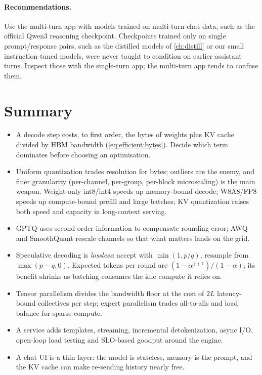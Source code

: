 \paragraph{Recommendations.} Use the multi-turn app with models trained on multi-turn chat
data, such as the official Qwen3 reasoning checkpoint. Checkpoints trained only on
single prompt/response pairs, such as the distilled models of \cref{ch:distill} or our
small instruction-tuned models, were never taught to condition on earlier assistant
turns. Inspect those with the single-turn app; the multi-turn app tends to confuse them.

\section{Summary}
\begin{itemize}
  \item A decode step costs, to first order, the bytes of weights plus KV cache divided
        by HBM bandwidth (\cref{eq:efficient:bytes}). Decide which term dominates before
        choosing an optimisation.
  \item Uniform quantization trades resolution for bytes; outliers are the enemy, and
        finer granularity (per-channel, per-group, per-block microscaling) is the main
        weapon. Weight-only int8/int4 speeds up memory-bound decode; W8A8/FP8 speeds up
        compute-bound prefill and large batches; KV quantization raises both speed and
        capacity in long-context serving.
  \item GPTQ uses second-order information to compensate rounding error; AWQ and SmoothQuant
        rescale channels so that what matters lands on the grid.
  \item Speculative decoding is \emph{lossless}: accept with $\min(1,p/q)$, resample from
        $\max(p-q,0)$. Expected tokens per round are $(1-\alpha^{\gamma+1})/(1-\alpha)$;
        its benefit shrinks as batching consumes the idle compute it relies on.
  \item Tensor parallelism divides the bandwidth floor at the cost of $2L$ latency-bound
        collectives per step; expert parallelism trades all-to-alls and load balance for
        sparse compute.
  \item A service adds templates, streaming, incremental detokenization, async I/O,
        open-loop load testing and SLO-based goodput around the engine.
  \item A chat UI is a thin layer: the model is stateless, memory is the prompt, and the
        KV cache can make re-sending history nearly free.
\end{itemize}

